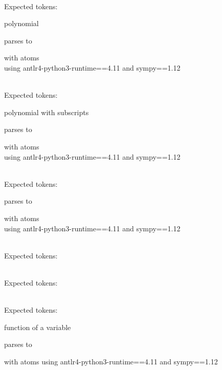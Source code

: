 \documentclass{article}
\begin{document}
\ \\
Expected tokens: 


\hrulefill

polynomial
    
parses to

with atoms 
\\
using antlr4-python3-runtime==4.11 and sympy==1.12

\ \\
Expected tokens: 


\hrulefill

polynomial with subscripts
  
parses to

with atoms 
\\
using antlr4-python3-runtime==4.11 and sympy==1.12

\ \\
Expected tokens:



\hrulefill



parses to

with atoms 
\\
using antlr4-python3-runtime==4.11 and sympy==1.12

\ \\
Expected tokens: 


\hrulefill





\ \\
Expected tokens: 


\hrulefill






\ \\
Expected tokens: 


\hrulefill


function of a variable

parses to

with atoms
using antlr4-python3-runtime==4.11 and sympy==1.12
\end{document}
